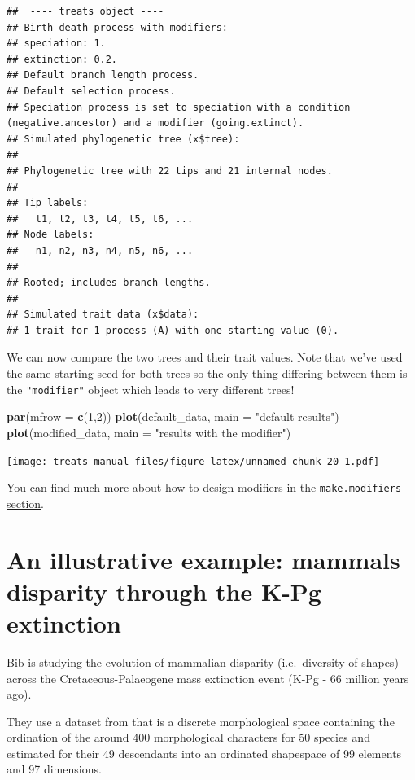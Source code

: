 \documentclass[
]{book}
\newenvironment{Shaded}{\begin{snugshade}}{\end{snugshade}}
\newcommand{\DataTypeTok}[1]{\textcolor[rgb]{0.13,0.29,0.53}{#1}}
\newcommand{\DecValTok}[1]{\textcolor[rgb]{0.00,0.00,0.81}{#1}}
\newcommand{\KeywordTok}[1]{\textcolor[rgb]{0.13,0.29,0.53}{\textbf{#1}}}
\newcommand{\NormalTok}[1]{#1}
\newcommand{\StringTok}[1]{\textcolor[rgb]{0.31,0.60,0.02}{#1}}
\begin{document}
\begin{verbatim}
##  ---- treats object ---- 
## Birth death process with modifiers:
## speciation: 1.
## extinction: 0.2.
## Default branch length process.
## Default selection process.
## Speciation process is set to speciation with a condition (negative.ancestor) and a modifier (going.extinct).
## Simulated phylogenetic tree (x$tree):
## 
## Phylogenetic tree with 22 tips and 21 internal nodes.
## 
## Tip labels:
##   t1, t2, t3, t4, t5, t6, ...
## Node labels:
##   n1, n2, n3, n4, n5, n6, ...
## 
## Rooted; includes branch lengths.
## 
## Simulated trait data (x$data):
## 1 trait for 1 process (A) with one starting value (0).
\end{verbatim}

We can now compare the two trees and their trait values.
Note that we've used the same starting seed for both trees so the only thing differing between them is the \texttt{"modifier"} object which leads to very different trees!

\begin{Shaded}
\begin{Highlighting}[]
\KeywordTok{par}\NormalTok{(}\DataTypeTok{mfrow =} \KeywordTok{c}\NormalTok{(}\DecValTok{1}\NormalTok{,}\DecValTok{2}\NormalTok{))}
\KeywordTok{plot}\NormalTok{(default\_data, }\DataTypeTok{main =} \StringTok{"default results"}\NormalTok{)}
\KeywordTok{plot}\NormalTok{(modified\_data, }\DataTypeTok{main =} \StringTok{"results with the modifier"}\NormalTok{)}
\end{Highlighting}
\end{Shaded}

\texttt{[image: treats\_manual\_files/figure-latex/unnamed-chunk-20-1.pdf]}

You can find much more about how to design modifiers in the \protect\hyperlink{makemodifiers}{\texttt{make.modifiers} section}.

\hypertarget{kpgexample}{%
\section{An illustrative example: mammals disparity through the K-Pg extinction}\label{kpgexample}}

Bib is studying the evolution of mammalian disparity (i.e.~diversity of shapes) across the Cretaceous-Palaeogene mass extinction event (K-Pg - 66 million years ago).

They use a dataset from \citet{beck2014ancient} that is a discrete morphological space containing the ordination of the around 400 morphological characters for 50 species and estimated for their 49 descendants into an ordinated shapespace of 99 elements and 97 dimensions.
\end{document}
